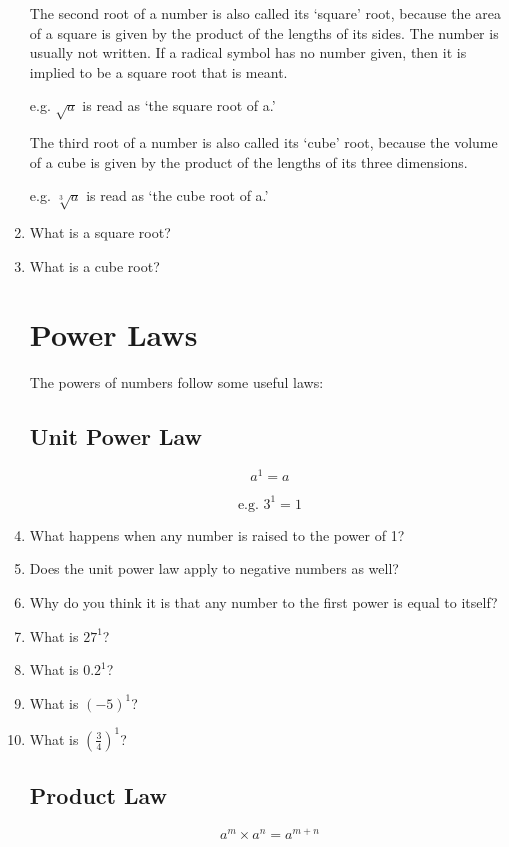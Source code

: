 \documentclass{article}
\begin{document}
\begin{enumerate}
\vspace{16pt}
The second root of a number is also called its ‘square’ root, because the area of a square is given by the product of the lengths of its sides. The number is usually not written. If a radical symbol has no number given, then it is implied to be a square root that is meant.

e.g. $\sqrt{a}$ is read as ‘the square root of a.’

The third root of a number is also called its ‘cube’ root, because the volume of a cube is given by the product of the lengths of its three dimensions.

e.g.	$\sqrt[3]{a}$ is read as ‘the cube root of a.’

\vspace{16pt}
\item What is a square root?
\item What is a cube root?

\section*{Power Laws}

The powers of numbers follow some useful laws:\\

\subsection*{Unit Power Law}
\begin{Large}
$$a^1=a$$
\end{Large}
$$\text{e.g. }3^1=1$$

\item What happens when any number is raised to the power of 1?
\item Does the unit power law apply to negative numbers as well?
\item Why do you think it is that any number to the first power is equal to itself?
\item What is $27^1$?
\item What is $0.2^1$?
\item What is $(-5)^1$?
\item What is $(\frac{3}{4})^1$?

\subsection*{Product Law}
\begin{Large}
$$a^m\times a^n=a^{m+n}$$
\end{Large}


\end{enumerate}
\end{document}
